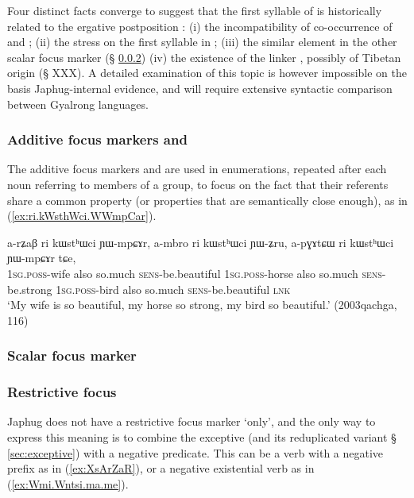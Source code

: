 Four distinct facts converge to suggest that the first syllable of  is historically related to the ergative postposition : (i) the incompatibility of co-occurrence of  and ; (ii) the stress on the first syllable in ; (iii) the similar  element in the other scalar focus marker  (§ \ref{sec:cinA}) (iv) the existence of the linker , possibly of Tibetan origin (§ XXX). A detailed examination of this topic is however impossible on the basis Japhug-internal evidence, and will require extensive syntactic comparison between Gyalrong languages.

 \subsubsection{Additive focus markers  and } \label{sec:ri.additive} 
 The additive focus markers  and  are used in enumerations, repeated after each noun referring to  members of a group, to focus on the fact that their referents share a common property (or properties that are semantically close enough), as in (\ref{ex:ri.kWsthWci.WWmpCar}).
 
 \begin{exe}
\ex \label{ex:ri.kWsthWci.WWmpCar}
 \gll  a-rʑaβ ri kɯstʰɯci ɲɯ-mpɕɤr, a-mbro ri kɯstʰɯci ɲɯ-ʑru, a-pɣɤtɕɯ ri kɯstʰɯci ɲɯ-mpɕɤr tɕe, \\
 \textsc{1sg}.\textsc{poss}-wife also so.much \textsc{sens}-be.beautiful  \textsc{1sg}.\textsc{poss}-horse also so.much \textsc{sens}-be.strong  \textsc{1sg}.\textsc{poss}-bird also so.much \textsc{sens}-be.beautiful \textsc{lnk} \\
 \glt `My wife is so beautiful, my horse so strong, my bird so beautiful.' (2003qachga, 116)
 \end{exe}
 
 
 
 \subsubsection{Scalar focus marker } \label{sec:cinA} 
 
  \subsubsection{Restrictive focus} \label{sec:restrictive.focus} 
 Japhug does not have a restrictive focus marker `only', and the only way to express this meaning is to combine the exceptive  (and its reduplicated variant  § \ref{sec:exceptive}) with a negative predicate. This can be a verb with a negative prefix as in (\ref{ex:XsArZaR}), or a negative existential verb as in (\ref{ex:Wmi.Wntsi.ma.me}).
 
